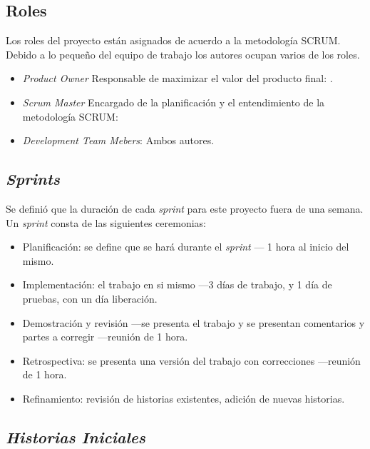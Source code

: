 \subsection{Roles}

Los roles del proyecto están asignados de acuerdo a la metodología SCRUM. Debido a lo pequeño del equipo de trabajo los autores ocupan varios de los roles.

\begin{itemize}
  \item \textit{Product Owner} Responsable de maximizar el valor del producto final: \atsecondauthor.
  \item \textit{Scrum Master} Encargado de la planificación y el entendimiento de la metodología SCRUM: \atfirstauthor
  \item \textit{Development Team Mebers}: Ambos autores.
\end{itemize}


\subsection{\textit{Sprints}}
\label{sec:sprints}

Se definió que la duración de cada \textit{sprint} para este proyecto fuera de una semana. Un \textit{sprint} consta de las siguientes ceremonias:


\begin{itemize}
  \item Planificación: se define que se hará durante el \textit{sprint} — 1 hora al inicio del mismo.
  \item Implementación: el trabajo en si mismo —3 días de trabajo, y 1 día de pruebas, con un día liberación.  
  \item Demostración y revisión —se presenta el trabajo y se presentan comentarios y partes a corregir —reunión de 1 hora.
  \item Retrospectiva: se presenta una versión del trabajo con correcciones —reunión de 1 hora. 
  \item Refinamiento: revisión de historias existentes, adición de nuevas historias.
\end{itemize}


\subsection{\textit{Historias Iniciales}}

